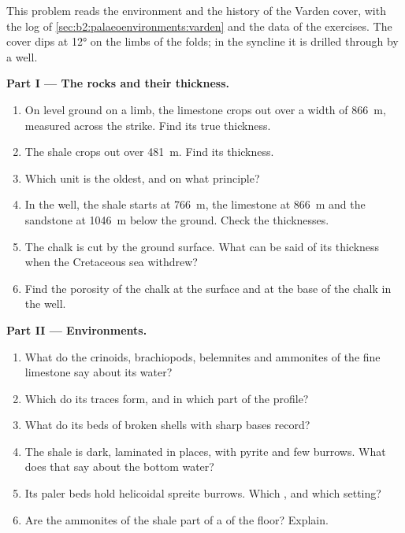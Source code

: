 \begin{problem}\label{pb:b2:palaeoenvironments:1}
This problem reads the environment and the history of the Varden cover, with the log of
\cref{sec:b2:palaeoenvironments:varden} and the data of the exercises. The cover dips at
\ang{12} on the limbs of the folds; in the syncline it is drilled through by a well.

\medskip\noindent\textbf{Part I --- The rocks and their thickness.}
\begin{enumerate}
  \item On level ground on a limb, the limestone crops out over a width of \qty{866}{m}, measured
        across the strike. Find its true thickness.
  \item The shale crops out over \qty{481}{m}. Find its thickness.
  \item Which unit is the oldest, and on what principle?
  \item In the well, the shale starts at \qty{766}{m}, the limestone at \qty{866}{m} and the
        sandstone at \qty{1046}{m} below the ground. Check the thicknesses.
  \item The chalk is cut by the ground surface. What can be said of its thickness when the
        Cretaceous sea withdrew?
  \item Find the porosity of the chalk at the surface and at the base of the chalk in the well.
\end{enumerate}

\medskip\noindent\textbf{Part II --- Environments.}
\begin{enumerate}[resume]
  \item What do the crinoids, brachiopods, belemnites and ammonites of the fine limestone say
        about its water?
  \item Which  do its traces form, and in which part of the profile?
  \item What do its beds of broken shells with sharp bases record?
  \item The shale is dark, laminated in places, with pyrite and few burrows. What does that say
        about the bottom water?
  \item Its paler beds hold helicoidal spreite burrows. Which , and which setting?
  \item Are the ammonites of the shale part of a  of the floor? Explain.
\end{enumerate}


\end{problem}
